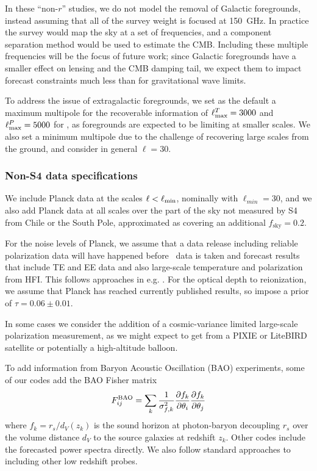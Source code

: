 In these ``non-$r$'' studies, we do not model the removal of Galactic foregrounds, instead assuming that all of the survey weight is focused at 150~GHz. In practice the survey would map the sky at a set of frequencies, and a component separation method would be used to estimate the CMB. Including these multiple frequencies will be the focus of future work; since Galactic foregrounds have a smaller effect on lensing and the CMB damping tail, we expect them to impact forecast constraints much less than for gravitational wave limits.

To address the issue of extragalactic foregrounds, we set as the default a maximum multipole for the recoverable information of $\ell^T_{\rm max} = 3000$ and $\ell^P_{\rm max} = 5000$ for \cmbexp, as foregrounds are expected to be limiting at smaller scales. We also set a minimum multipole due to the challenge of recovering large scales from the ground, and consider in general $\ell=30$. 

\subsubsection{Non-S4 data specifications}

We include Planck data at the scales $\ell<\ell_{\rm min}$, nominally with $\ell_{min}=30$, and we also add Planck data at all scales over the part of the sky not measured by S4 from Chile or the South Pole, approximated as covering an additional $f_\mathrm{sky}=0.2$.

For the noise levels of Planck, we assume that a data release including reliable polarization data will have happened before \cmbexp\ data is taken and forecast results that include TE and EE data and also large-scale temperature and polarization from HFI. This follows approaches in e.g. \cite{Allison:2015qca}. For the optical depth to reionization, we assume that Planck has reached currently published results, so impose a prior of $\tau=0.06\pm0.01$.

In some cases we consider the addition of a cosmic-variance limited large-scale polarization measurement, as we might expect to get from a PIXIE or LiteBIRD satellite or potentially a high-altitude balloon.

To add information from Baryon Acoustic Oscillation (BAO) experiments, some of our codes add the BAO Fisher matrix
%
\begin{equation}
F_{ij}^{\rm BAO} = \sum_{k} \frac{1}{\sigma_{f,k}^2}\frac{\partial f_k}{\partial \theta_i}\frac{\partial f_k}{\partial \theta_j}
\end{equation}
%
where $f_k = r_s/d_V(z_k)$ is the sound horizon at photon-baryon decoupling $r_s$ over the volume distance $d_V$ to the source galaxies at redshift $z_k$. Other codes include the forecasted power spectra directly. We also follow standard approaches to including other low redshift probes.

